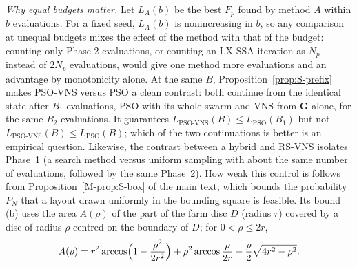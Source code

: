 \emph{Why equal budgets matter.} Let $L_A(b)$ be the best $F_p$ found by method $A$ within $b$ evaluations. For a fixed seed, $L_A(b)$ is nonincreasing in $b$, so any comparison at unequal budgets mixes the effect of the method with that of the budget: counting only Phase-2 evaluations, or counting an LX-SSA iteration as $N_p$ instead of $2N_p$ evaluations, would give one method more evaluations and an advantage by monotonicity alone. At the same $B$, Proposition~\ref{prop:S-prefix} makes PSO-VNS versus PSO a clean contrast: both continue from the identical state after $B_1$ evaluations, PSO with its whole swarm and VNS from $\mathbf G$ alone, for the same $B_2$ evaluations. It guarantees $L_{\text{PSO-VNS}}(B)\le L_{\text{PSO}}(B_1)$ but not $L_{\text{PSO-VNS}}(B)\le L_{\text{PSO}}(B)$; which of the two continuations is better is an empirical question. Likewise, the contrast between a hybrid and RS-VNS isolates Phase~1 (a search method versus uniform sampling with about the same number of evaluations, followed by the same Phase~2). How weak this control is follows from Proposition~\ref{M-prop:S-box} of the main text, which bounds the probability $P_N$ that a layout drawn uniformly in the bounding square is feasible. Its bound (b) uses the area $A(\rho)$ of the part of the farm disc $D$ (radius $r$) covered by a disc of radius $\rho$ centred on the boundary of $D$; for $0<\rho\le2r$,
\begin{equation}
A(\rho)=r^2\arccos\Bigl(1-\frac{\rho^2}{2r^2}\Bigr)+\rho^2\arccos\frac{\rho}{2r}-\frac{\rho}{2}\sqrt{4r^2-\rho^2} .
\label{eq:S-th-lens}
\end{equation}

